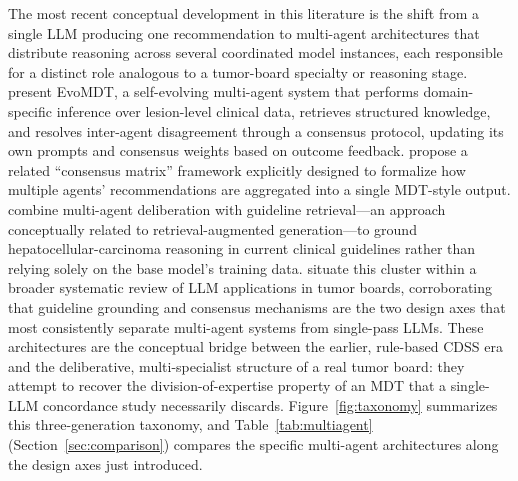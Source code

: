\documentclass[acmsmall,screen=true,review=false,nonacm=true]{acmart}
\begin{document}
The most recent conceptual development in this literature is the shift from a single LLM producing one recommendation to multi-agent architectures that distribute reasoning across several coordinated model instances, each responsible for a distinct role analogous to a tumor-board specialty or reasoning stage. \citet{liu2026} present EvoMDT, a self-evolving multi-agent system that performs domain-specific inference over lesion-level clinical data, retrieves structured knowledge, and resolves inter-agent disagreement through a consensus protocol, updating its own prompts and consensus weights based on outcome feedback. \citet{han2025} propose a related ``consensus matrix'' framework explicitly designed to formalize how multiple agents' recommendations are aggregated into a single MDT-style output. \citet{saenz2026} combine multi-agent deliberation with guideline retrieval---an approach conceptually related to retrieval-augmented generation---to ground hepatocellular-carcinoma reasoning in current clinical guidelines rather than relying solely on the base model's training data. \citet{konzmann2026} situate this cluster within a broader systematic review of LLM applications in tumor boards, corroborating that guideline grounding and consensus mechanisms are the two design axes that most consistently separate multi-agent systems from single-pass LLMs. These architectures are the conceptual bridge between the earlier, rule-based CDSS era and the deliberative, multi-specialist structure of a real tumor board: they attempt to recover the division-of-expertise property of an MDT that a single-LLM concordance study necessarily discards. Figure~\ref{fig:taxonomy} summarizes this three-generation taxonomy, and Table~\ref{tab:multiagent} (Section~\ref{sec:comparison}) compares the specific multi-agent architectures along the design axes just introduced.
\end{document}
